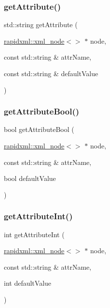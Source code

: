 \subsubsection{\texorpdfstring{get\+Attribute()}{getAttribute()}}
{\footnotesize\ttfamily std\+::string get\+Attribute (\begin{DoxyParamCaption}\item[{\mbox{\hyperlink{classrapidxml_1_1xml__node}{rapidxml\+::xml\+\_\+node}}$<$$>$ $\ast$}]{node,  }\item[{const std\+::string \&}]{attr\+Name,  }\item[{const std\+::string \&}]{default\+Value }\end{DoxyParamCaption})}

\mbox{\label{namespacexmlutils_add5287d01ce8f47fbad34af589a3b52c}} 
\subsubsection{\texorpdfstring{get\+Attribute\+Bool()}{getAttributeBool()}}
{\footnotesize\ttfamily bool get\+Attribute\+Bool (\begin{DoxyParamCaption}\item[{\mbox{\hyperlink{classrapidxml_1_1xml__node}{rapidxml\+::xml\+\_\+node}}$<$$>$ $\ast$}]{node,  }\item[{const std\+::string \&}]{attr\+Name,  }\item[{bool}]{default\+Value }\end{DoxyParamCaption})}

\mbox{\label{namespacexmlutils_aad19c1ecd2c1a058f7710f6d2246de87}} 
\subsubsection{\texorpdfstring{get\+Attribute\+Int()}{getAttributeInt()}}
{\footnotesize\ttfamily int get\+Attribute\+Int (\begin{DoxyParamCaption}\item[{\mbox{\hyperlink{classrapidxml_1_1xml__node}{rapidxml\+::xml\+\_\+node}}$<$$>$ $\ast$}]{node,  }\item[{const std\+::string \&}]{attr\+Name,  }\item[{int}]{default\+Value }\end{DoxyParamCaption})}

